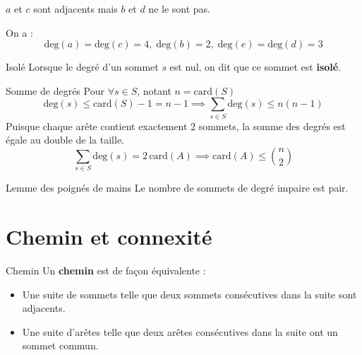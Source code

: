 \begin{Example}{}{}
\begin{center}
\end{center}
$a$ et $c$ sont adjacents mais $b$ et $d$ ne le sont pas.

On a :
    \[
    \mathrm{deg} (a) = \mathrm{deg} (c) = 4,\; \mathrm{deg} (b) = 2,\; \mathrm{deg} (e) = \mathrm{deg} (d) = 3
    \]
\end{Example}

\begin{Definition}[colbacktitle=red!75!black]{Isolé}{}
Lorsque le degré d'un sommet $s$ est nul, on dit que ce sommet est \textbf{isolé}.
\end{Definition}


\begin{Prop}{Somme de degrés}{}
Pour $\forall s \in S$,  notant $n = \mathrm{card}(S)$
\[
\mathrm{deg}(s) \le \mathrm{card}(S) - 1 = n-1 \implies \boxed{\sum_{s \in S} \mathrm{deg}(s) \le n(n-1)}
\]
Puisque chaque arête contient exactement 2 sommets, la somme des degrés est égale au double de la taille.
 \[
   \boxed{\sum_{s \in S} \mathrm{deg} (s) = 2 \,\mathrm{car d} (A)} \implies \mathrm{card}(A) \le \binom{n}{2}
\]
\end{Prop}


\begin{Corollary}{Lemme des poignés de mains}{}
Le nombre de sommets de degré impaire est pair.
\end{Corollary}


\section{Chemin et connexité}

\begin{Definition}[colbacktitle=red!75!black]{Chemin}{}
Un \textbf{chemin} est de façon équivalente :
\begin{itemize}
    \item Une suite de sommets telle que deux sommets consécutives dans la suite sont adjacents.
    \item Une suite d'arêtes telle que deux arêtes consécutives dans la suite ont un sommet commun.
\end{itemize}
\end{Definition}


